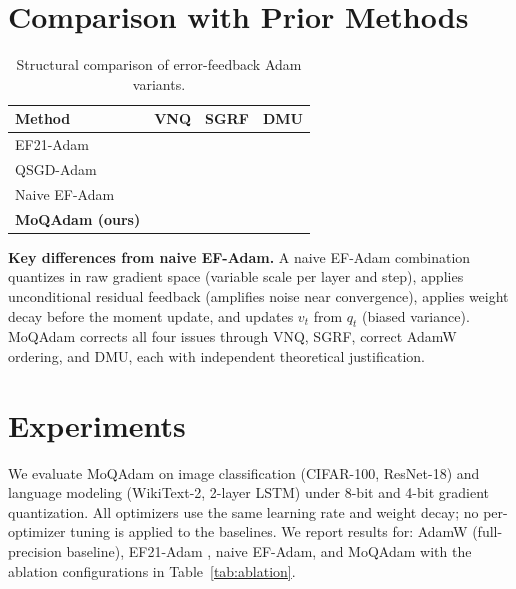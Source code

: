 \documentclass[10pt,twocolumn]{article}
\newcommand{\cmark}{\ding{51}}
\newcommand{\xmark}{\ding{55}}
\begin{document}
\section{Comparison with Prior Methods}

\begin{table}[h]
\centering
\caption{Structural comparison of error-feedback Adam variants.}
\label{tab:comparison}
\begin{tabular}{lccc}
\toprule
\textbf{Method} & \textbf{VNQ} & \textbf{SGRF} & \textbf{DMU} \\
\midrule
EF21-Adam \cite{richtarik2021ef21}  & \xmark & \xmark & \xmark \\
QSGD-Adam \cite{alistarh2017qsgd}   & \xmark & \xmark & \xmark \\
Naive EF-Adam                        & \xmark & \xmark & \xmark \\
\textbf{MoQAdam (ours)}             & \cmark & \cmark & \cmark \\
\bottomrule
\end{tabular}
\end{table}

\noindent
\textbf{Key differences from naive EF-Adam.}
A naive EF-Adam combination quantizes in raw gradient space (variable
scale per layer and step), applies unconditional residual feedback
(amplifies noise near convergence), applies weight decay before the
moment update, and updates $v_t$ from $q_t$ (biased variance).
MoQAdam corrects all four issues through VNQ, SGRF, correct AdamW
ordering, and DMU, each with independent theoretical justification.

\section{Experiments}

We evaluate MoQAdam on image classification (CIFAR-100, ResNet-18) and
language modeling (WikiText-2, 2-layer LSTM) under 8-bit and 4-bit
gradient quantization.  All optimizers use the same learning rate and
weight decay; no per-optimizer tuning is applied to the baselines.
We report results for: AdamW (full-precision baseline),
EF21-Adam \cite{richtarik2021ef21}, naive EF-Adam, and MoQAdam with
the ablation configurations in Table~\ref{tab:ablation}.
\end{document}
